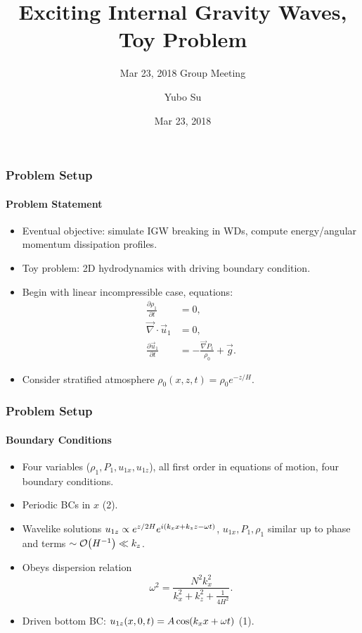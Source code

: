 \documentclass[dvipsnames]{beamer}
\newcommand*{\pd}[2]{\frac{\partial#1}{\partial#2}}
\DeclarePairedDelimiter\p{\lparen}{\rparen}
\begin{document}
\pagestyle{fancy}
\cfoot{\thepage/\pageref{LastPage}}

\title[Exciting Internal Gravity Waves]{Exciting Internal Gravity Waves, Toy
Problem}
\subtitle[]{Mar 23, 2018 Group Meeting}
\author[Yubo Su]{Yubo Su}
\date{Mar 23, 2018}

\frame{\titlepage}

\begin{frame}
    \frametitle{Problem Setup}
    \framesubtitle{Problem Statement}
    \begin{itemize}
        \item Eventual objective: simulate IGW breaking in WDs, compute
            energy/angular momentum dissipation profiles.
        \item Toy problem: 2D hydrodynamics with driving boundary condition.
        \item Begin with linear incompressible case, equations:
        \begin{subequations}\label{se:eom}
            \begin{align}
                \pd{\rho_1}{t} &= 0,\\
                \vec{\nabla} \cdot \vec{u}_1 &= 0,\\
                \pd{\vec{u}_1}{t} &= -\frac{\vec{\nabla}P_1}{\rho_0} + \vec{g}.
            \end{align}
        \end{subequations}

        \item Consider stratified atmosphere $\rho_0(x, z, t) = \rho_0
            e^{-z/H}$.
    \end{itemize}
\end{frame}

\begin{frame}
    \frametitle{Problem Setup}
    \framesubtitle{Boundary Conditions}

    \begin{itemize}
        \item Four variables ($\rho_1, P_1, u_{1x}, u_{1z}$), all first order in
            equations of motion, four boundary conditions.

        \item Periodic BCs in $x$ (2).

        \item Wavelike solutions $u_{1z} \propto e^{z/2H}e^{i\p*{k_xx + k_zz -
            \omega t}}$, $u_{1x}, P_1, \rho_1$ similar up to phase and terms
            $\sim \mathcal{O}\p*{H^{-1}} \ll k_z$.

        \item Obeys dispersion relation
            \begin{equation}
                \omega^2 = \frac{N^2k_x^2}{k_x^2 + k_z^2 + \frac{1}{4H^2}}.
            \end{equation}

        \item Driven bottom BC\@: $u_{1z}(x, 0, t) = A\cos \p*{k_xx + \omega t}$
            (1).
    \end{itemize}
\end{frame}
\end{document}
